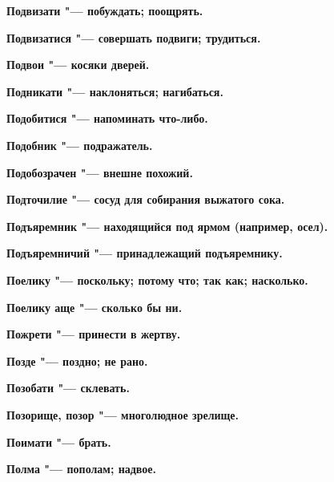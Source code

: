 \begin{mymulticols}{2}
\bfseries Подвизати\normalfont{} "--- побуждать; поощрять. 




\bfseries Подвизатися\normalfont{} "--- совершать подвиги; трудиться. 




\bfseries Подвои\normalfont{} "--- косяки дверей. 




\bfseries Подникати\normalfont{} "--- наклоняться; нагибаться. 




\bfseries Подобитися\normalfont{} "--- напоминать что-либо. 




\bfseries Подобник\normalfont{} "--- подражатель. 




\bfseries Подобозрачен\normalfont{} "--- внешне похожий. 




\bfseries Подточилие\normalfont{} "--- сосуд для собирания выжатого сока. 




\bfseries Подъяремник\normalfont{} "--- находящийся под ярмом (например, осел). 




\bfseries Подъяремничий\normalfont{} "--- принадлежащий подъяремнику. 




\bfseries Поелику\normalfont{} "--- поскольку; потому что; так как; насколько. 




\bfseries Поелику аще\normalfont{} "--- сколько бы ни. 




\bfseries Пожрети\normalfont{} "--- принести в жертву. 




\bfseries Позде\normalfont{} "--- поздно; не рано. 




\bfseries Позобати\normalfont{} "--- склевать. 




\bfseries Позорище, позор\normalfont{} "--- многолюдное зрелище. 




\bfseries Поимати\normalfont{} "--- брать. 




\bfseries Полма\normalfont{} "--- пополам; надвое. 





\end{mymulticols}
